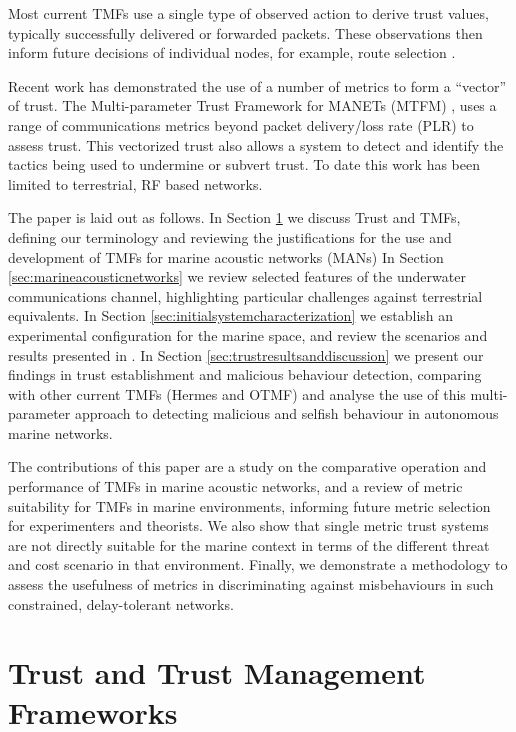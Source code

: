 Most current TMFs use a single type of observed action to derive trust values, typically successfully delivered or forwarded packets. 
These observations then inform future decisions of individual nodes, for example, route selection \cite{Li2008}.

Recent work has demonstrated the use of a number of metrics to form a ``vector'' of trust.
The Multi-parameter Trust Framework for MANETs (MTFM) \cite{Guo11}, uses a range of communications metrics beyond packet delivery/loss rate (PLR) to assess trust.
This vectorized trust also allows a system to detect and identify the tactics being used to undermine or subvert trust.
To date this work has been limited to terrestrial, RF based networks. 

The paper is laid out as follows.
In Section \ref{sec:trustandtmfs} we discuss Trust and TMFs, defining our terminology and reviewing the justifications for the use and development of TMFs for marine acoustic networks (MANs)
In Section \ref{sec:marineacousticnetworks} we review selected features of the underwater communications channel, highlighting particular challenges against terrestrial equivalents.
In Section \ref{sec:initialsystemcharacterization} we establish an experimental configuration for the marine space, and review the scenarios and results presented in \cite{Guo11}.
In Section \ref{sec:trustresultsanddiscussion} we present our findings in trust establishment and malicious behaviour detection, comparing with other current TMFs (Hermes and OTMF) and analyse the use of this multi-parameter approach to detecting malicious and selfish behaviour in autonomous marine networks.

The contributions of this paper are a study on the comparative operation and performance of TMFs in marine acoustic networks, and a review of metric suitability for TMFs in marine environments, informing future metric selection for experimenters and theorists.
We also show that single metric trust systems are not directly suitable for the marine context in terms of the different threat and cost scenario in that environment.
Finally, we demonstrate a methodology to assess the usefulness of metrics in discriminating against misbehaviours in such constrained, delay-tolerant networks.



\section{Trust and Trust Management Frameworks}\label{sec:trustandtmfs}


